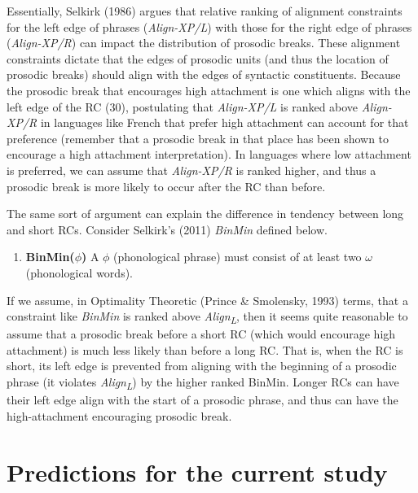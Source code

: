 \documentclass[12pt,oneside]{book}
\providecommand{\tightlist}{%
  \setlength{\itemsep}{0pt}\setlength{\parskip}{0pt}}
\begin{document}
Essentially, Selkirk (1986) argues that relative ranking of alignment constraints for the left edge of phrases (\emph{Align-XP/L}) with those for the right edge of phrases (\emph{Align-XP/R}) can impact the distribution of prosodic breaks. These alignment constraints dictate that the edges of prosodic units (and thus the location of prosodic breaks) should align with the edges of syntactic constituents. Because the prosodic break that encourages high attachment is one which aligns with the left edge of the RC  (30), postulating that \emph{Align-XP/L} is ranked above \emph{Align-XP/R} in languages like French that prefer high attachment can account for that preference (remember that a prosodic break in that place has been shown to encourage a high attachment interpretation). In languages where low  attachment is preferred, we can assume that \emph{Align-XP/R} is ranked higher, and thus a prosodic break is more likely to occur after the RC than before.

The same sort of argument can explain the difference in tendency between long and short RCs. Consider Selkirk's (2011) \emph{BinMin} defined below.

\begin{enumerate}
\def\labelenumi{(\arabic{enumi})}
\setcounter{enumi}{32}
\tightlist
\item
  \textbf{BinMin(\(\phi\))} \linebreak
  A \(\phi\) (phonological phrase) must consist of at least two \(\omega\) (phonological words).
\end{enumerate}

If we assume, in Optimality Theoretic (Prince \& Smolensky, 1993) terms, that a constraint like \emph{BinMin} is ranked above \emph{Align\textsubscript{L}}, then it seems quite reasonable to assume that a prosodic break before a short RC (which would encourage high attachment) is much less likely than before a long RC. That is, when the RC is short, its left edge is prevented from aligning with the beginning of a prosodic phrase (it violates \emph{Align\textsubscript{L}}) by the higher ranked BinMin. Longer RCs can have their left edge align with the start of a prosodic phrase, and thus can have the high-attachment encouraging prosodic break.

\hypertarget{predictions-for-the-current-study}{%
\section{Predictions for the current study}\label{predictions-for-the-current-study}}
\end{document}
